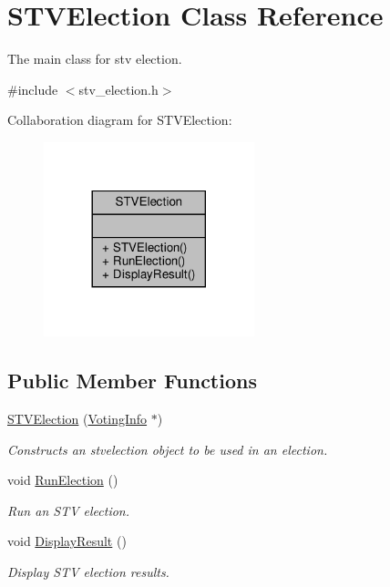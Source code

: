 \hypertarget{classSTVElection}{}\section{S\+T\+V\+Election Class Reference}
\label{classSTVElection}


The main class for stv election.  




{\ttfamily \#include $<$stv\+\_\+election.\+h$>$}



Collaboration diagram for S\+T\+V\+Election\+:
\nopagebreak
\begin{figure}[H]
\begin{center}
\leavevmode
\includegraphics[width=173pt]{classSTVElection__coll__graph}
\end{center}
\end{figure}
\subsection*{Public Member Functions}
\begin{DoxyCompactItemize}
\item 
\hyperlink{classSTVElection_a6abe30e81059242a53f0c06c29331d10}{S\+T\+V\+Election} (\hyperlink{classVotingInfo}{Voting\+Info} $\ast$)
\begin{DoxyCompactList}\small\item\em Constructs an stvelection object to be used in an election. \end{DoxyCompactList}\item 
void \hyperlink{classSTVElection_a3b80c78d70ba3dc7181884b0dfcf142e}{Run\+Election} ()
\begin{DoxyCompactList}\small\item\em Run an S\+TV election. \end{DoxyCompactList}\item 
void \hyperlink{classSTVElection_a224ba2c99b4dbd2f4bbce4de8b1e98f4}{Display\+Result} ()
\begin{DoxyCompactList}\small\item\em Display S\+TV election results. \end{DoxyCompactList}\end{DoxyCompactItemize}


